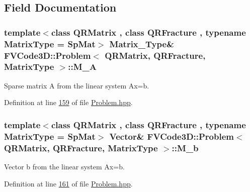 \subsection{Field Documentation}
\subsubsection[{\texorpdfstring{M\+\_\+A}{M_A}}]{\setlength{\rightskip}{0pt plus 5cm}template$<$class Q\+R\+Matrix , class Q\+R\+Fracture , typename Matrix\+Type  = Sp\+Mat$>$ {\bf Matrix\+\_\+\+Type}\& {\bf F\+V\+Code3\+D\+::\+Problem}$<$ Q\+R\+Matrix, Q\+R\+Fracture, Matrix\+Type $>$\+::M\+\_\+A\hspace{0.3cm}{\ttfamily [protected]}}\hypertarget{classFVCode3D_1_1Problem_ac105e74d7992025d275c2fae5a77bc12}{}\label{classFVCode3D_1_1Problem_ac105e74d7992025d275c2fae5a77bc12}


Sparse matrix A from the linear system Ax=b. 



Definition at line \hyperlink{Problem_8hpp_source_l00159}{159} of file \hyperlink{Problem_8hpp_source}{Problem.\+hpp}.

\subsubsection[{\texorpdfstring{M\+\_\+b}{M_b}}]{\setlength{\rightskip}{0pt plus 5cm}template$<$class Q\+R\+Matrix , class Q\+R\+Fracture , typename Matrix\+Type  = Sp\+Mat$>$ {\bf Vector}\& {\bf F\+V\+Code3\+D\+::\+Problem}$<$ Q\+R\+Matrix, Q\+R\+Fracture, Matrix\+Type $>$\+::M\+\_\+b\hspace{0.3cm}{\ttfamily [protected]}}\hypertarget{classFVCode3D_1_1Problem_a65a00ab96a21f389f50f273614f977d4}{}\label{classFVCode3D_1_1Problem_a65a00ab96a21f389f50f273614f977d4}


Vector b from the linear system Ax=b. 



Definition at line \hyperlink{Problem_8hpp_source_l00161}{161} of file \hyperlink{Problem_8hpp_source}{Problem.\+hpp}.

